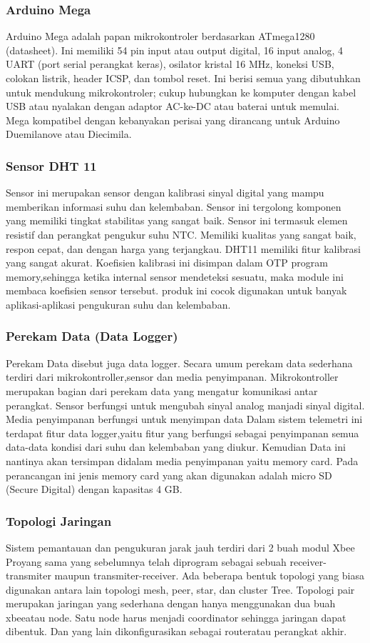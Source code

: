 \subsubsection{Arduino Mega}

Arduino Mega adalah papan mikrokontroler berdasarkan ATmega1280 (datasheet). Ini memiliki 54 pin input atau output digital, 16 input analog, 4 UART (port serial perangkat keras), osilator kristal 16 MHz, koneksi USB, colokan listrik, header ICSP, dan tombol reset. Ini berisi semua yang dibutuhkan untuk mendukung mikrokontroler; cukup hubungkan ke komputer dengan kabel USB atau nyalakan dengan adaptor AC-ke-DC atau baterai untuk memulai. Mega kompatibel dengan kebanyakan perisai yang dirancang untuk Arduino Duemilanove atau Diecimila.

\subsubsection{Sensor DHT 11}
Sensor ini merupakan sensor dengan kalibrasi sinyal digital yang mampu memberikan informasi suhu dan kelembaban. Sensor ini tergolong komponen yang memiliki tingkat stabilitas yang sangat baik. Sensor ini termasuk elemen resistif dan perangkat pengukur suhu NTC.
Memiliki kualitas yang sangat baik, respon cepat, dan dengan harga yang
terjangkau. DHT11 memiliki fitur kalibrasi yang sangat akurat. Koefisien kalibrasi ini disimpan dalam OTP program memory,sehingga ketika internal sensor mendeteksi sesuatu, maka module ini membaca koefisien sensor tersebut. produk ini cocok digunakan untuk banyak aplikasi-aplikasi pengukuran suhu dan kelembaban.

\subsubsection{Perekam Data (Data Logger)}
 Perekam Data disebut juga data logger. Secara umum perekam data sederhana terdiri dari mikrokontroller,sensor dan media penyimpanan.
Mikrokontroller merupakan bagian dari perekam data yang mengatur komunikasi antar perangkat. Sensor berfungsi untuk mengubah sinyal analog manjadi sinyal digital. Media penyimpanan berfungsi untuk menyimpan data Dalam sistem telemetri ini terdapat fitur data logger,yaitu fitur yang berfungsi sebagai penyimpanan semua data-data kondisi dari suhu dan kelembaban yang diukur. Kemudian Data ini nantinya akan
tersimpan didalam media penyimpanan yaitu memory card. Pada perancangan ini jenis memory card yang akan digunakan adalah micro SD 
(Secure Digital) dengan kapasitas 4 GB.

\subsubsection{Topologi Jaringan}
Sistem pemantauan dan pengukuran jarak jauh terdiri dari 2 buah modul 
Xbee Proyang sama yang sebelumnya telah diprogram sebagai sebuah receiver-transmiter maupun transmiter-receiver. Ada beberapa bentuk topologi yang biasa digunakan antara lain topologi mesh, peer, star, dan cluster Tree.
Topologi pair merupakan jaringan yang sederhana dengan hanya menggunakan dua buah xbeeatau node. Satu node harus menjadi coordinator sehingga jaringan dapat dibentuk. Dan yang lain dikonfigurasikan sebagai routeratau perangkat akhir.
